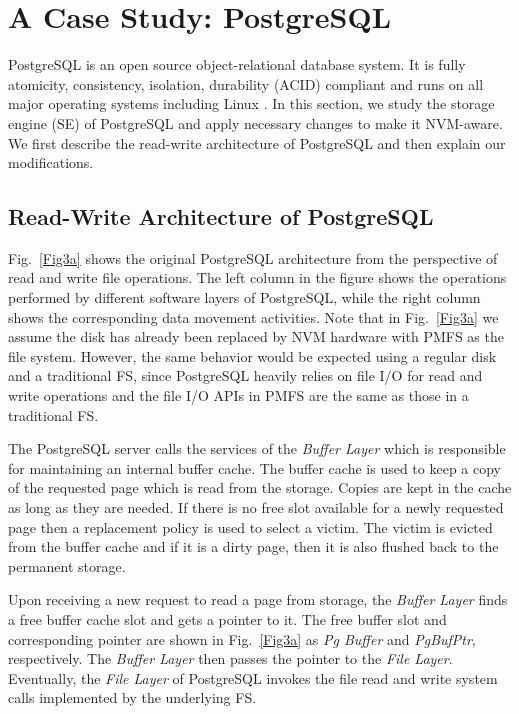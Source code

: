 \section{A Case Study: P\MakeLowercase{ostgre}SQL}
\label{sec:CaseStudy}
\noindent PostgreSQL is an open source object-relational database system. It is fully atomicity, consistency, isolation, durability (ACID) 
compliant and runs on all major operating systems including Linux \cite{momjian2001postgresql}. In this section, we study the 
storage engine (SE) of PostgreSQL and apply necessary changes to make it NVM-aware. We first describe the read-write architecture 
of PostgreSQL and then explain our modifications.



\subsection{Read-Write Architecture of PostgreSQL}

Fig.~\ref{Fig3a} shows the original PostgreSQL architecture from the perspective of read and write file operations. 
The left column in the figure shows the operations performed by different software layers of PostgreSQL, while the right column 
shows the corresponding data movement activities. Note that in Fig.~\ref{Fig3a} we assume the disk has already been replaced 
by NVM hardware with PMFS as the file system. However, the same behavior would be expected using a regular disk and a traditional 
FS, since PostgreSQL heavily relies on file I/O for read and write operations and the file I/O APIs in PMFS are the same as those 
in a traditional FS.

The PostgreSQL server calls the services of the  \textit{Buffer Layer} which is responsible for maintaining an 
internal buffer cache. The buffer cache is used to keep a copy of the requested page which is read from the 
storage. Copies are kept in the cache as long as they are needed. If there is no free
slot available for a newly requested page then a replacement policy is used to select a victim. 
The victim is evicted from the buffer cache and if it is 
a dirty page, then it is also flushed back to the permanent storage.

Upon receiving a new request to read a page from storage, the \textit{Buffer Layer} finds a free buffer cache slot 
and gets a pointer to it. The free buffer slot and corresponding pointer are shown in Fig.~\ref{Fig3a} as \textit{Pg Buffer} and \textit{PgBufPtr}, respectively. The \textit{Buffer Layer} then passes the pointer to the \textit{File Layer}. Eventually, the \textit{File Layer} of PostgreSQL invokes the file read and write system calls implemented by the 
underlying FS. 

